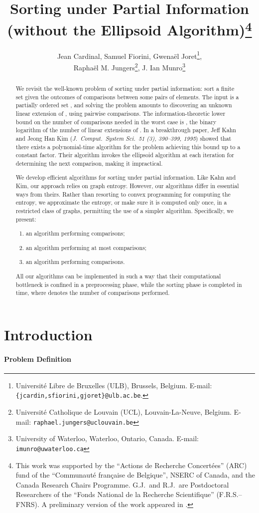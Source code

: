 \documentclass{article} \usepackage{fullpage}
\title{Sorting under Partial Information\\
(without the Ellipsoid Algorithm)\footnote{This work was supported by the ``Actions de Recherche Concert\'ees'' (ARC) fund of the ``Communaut\'e fran\c{c}aise de Belgique'', NSERC of Canada, and the Canada Research Chairs Programme. G.J.\ and R.J.\ are Postdoctoral Researchers of the ``Fonds National de la Recherche Scientifique'' (F.R.S.--FNRS). A preliminary version of the work appeared in \cite{SUPI-STOC}.}}
\date{}
\author{Jean Cardinal, Samuel Fiorini, Gwena\"el Joret\footnote{Universit\'e Libre de Bruxelles (ULB), Brussels, Belgium. {E-mail: \tt\small \{jcardin,sfiorini,gjoret\}@ulb.ac.be}.},\\ 
Rapha\"el M. Jungers\footnote{Universit\'e Catholique de Louvain (UCL), Louvain-La-Neuve, Belgium. {E-mail: \tt\small raphael.jungers@uclouvain.be}}, J. Ian Munro\footnote{University of Waterloo, Waterloo, Ontario, Canada. {E-mail: \tt\small imunro@uwaterloo.ca}}
}
\begin{document}
\maketitle

\sloppy

\begin{abstract}
We revisit the well-known problem of sorting under partial information: sort a finite set given the outcomes of comparisons between some pairs of elements. The input is a partially ordered set , and solving the problem amounts to discovering an unknown linear extension of , using pairwise comparisons. The information-theoretic lower bound on the number of comparisons needed in the worst case is , the binary logarithm of the number of linear extensions of . In a breakthrough paper, Jeff Kahn and Jeong Han Kim ({\em J.\ Comput.\ System Sci.\ 51 (3), 390--399, 1995}) showed that there exists a polynomial-time algorithm for the problem achieving this bound up to a constant factor. Their algorithm invokes the ellipsoid algorithm at each iteration for determining the next comparison, making it impractical.

We develop efficient algorithms for sorting under partial information. Like Kahn and Kim, our approach relies on graph entropy. However, our algorithms differ in essential ways from theirs. Rather than resorting to convex programming for computing the entropy, we approximate the entropy, or make sure it is computed only once, in a restricted class of graphs, permitting the use of a simpler algorithm. Specifically, we present:
\begin{enumerate}
\item an  algorithm performing  comparisons;
\item an  algorithm performing at most  comparisons;
\item an  algorithm performing  comparisons.
\end{enumerate}
All our algorithms can be implemented in such a way that their computational bottleneck is confined in a preprocessing phase, while the sorting phase is completed in  time, where  denotes the number of comparisons performed.
\end{abstract}

\newpage
\section{Introduction}

\paragraph*{Problem Definition}
\end{document}
